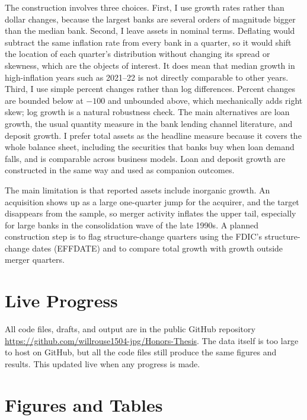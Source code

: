 \documentclass[11pt]{article}
\begin{document}
The construction involves three choices. First, I use growth rates rather than dollar changes, because the largest banks are several orders of magnitude bigger than the median bank. Second, I leave assets in nominal terms. Deflating would subtract the same inflation rate from every bank in a quarter, so it would shift the location of each quarter's distribution without changing its spread or skewness, which are the objects of interest. It does mean that median growth in high-inflation years such as 2021--22 is not directly comparable to other years. Third, I use simple percent changes rather than log differences. Percent changes are bounded below at $-100$ and unbounded above, which mechanically adds right skew; log growth is a natural robustness check. The main alternatives are loan growth, the usual quantity measure in the bank lending channel literature, and deposit growth. I prefer total assets as the headline measure because it covers the whole balance sheet, including the securities that banks buy when loan demand falls, and is comparable across business models. Loan and deposit growth are constructed in the same way and used as companion outcomes. 

The main limitation is that reported assets include inorganic growth. An acquisition shows up as a large one-quarter jump for the acquirer, and the target disappears from the sample, so merger activity inflates the upper tail, especially for large banks in the consolidation wave of the late 1990s. A planned construction step is to flag structure-change quarters using the FDIC's structure-change dates (EFFDATE) and to compare total growth with growth outside merger quarters.

\section*{Live Progress}

All code files, drafts, and output are in the public GitHub repository \url{https://github.com/willrouse1504-jpg/Honors-Thesis}. The data itself is too large to host on GitHub, but all the code files still produce the same figures and results. This updated live when any progress is made. 

\clearpage
\section*{Figures and Tables}
\end{document}
